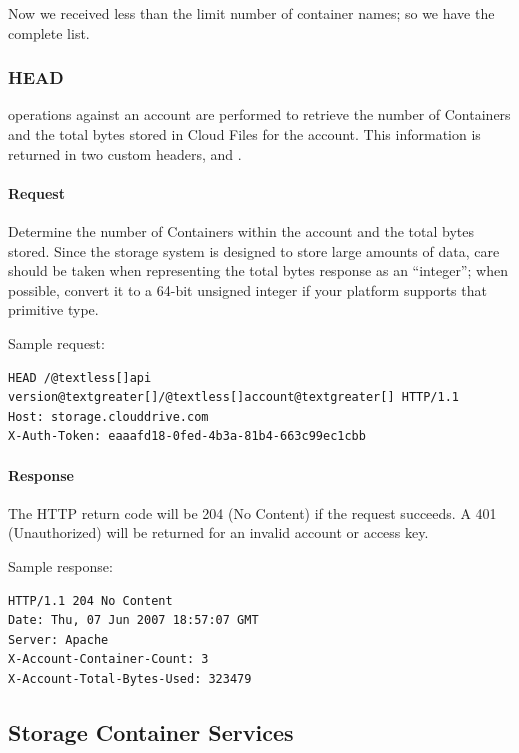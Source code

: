 \documentclass[letterpaper,10pt,english]{manual}
\begin{document}
Now we received less than the limit number of container names; so we have
the complete list.


\subsubsection{HEAD}

 operations against an account are performed to retrieve the
number of Containers and the total bytes stored in Cloud Files for the
account. This information is returned in two custom headers,
 and .


\paragraph{Request}

Determine the number of Containers within the account and the total bytes
stored.  Since the storage system is designed to store large amounts of
data, care should be taken when representing the total bytes response as
an “integer”; when possible, convert it to a 64-bit unsigned integer if
your platform supports that primitive type.

Sample request:

\begin{Verbatim}[commandchars=@\[\]]
HEAD /@textless[]api version@textgreater[]/@textless[]account@textgreater[] HTTP/1.1
Host: storage.clouddrive.com
X-Auth-Token: eaaafd18-0fed-4b3a-81b4-663c99ec1cbb
\end{Verbatim}


\paragraph{Response}

The HTTP return code will be 204 (No Content) if the request succeeds.
A 401 (Unauthorized) will be returned for an invalid account or access
key.

Sample response:

\begin{Verbatim}[commandchars=@\[\]]
HTTP/1.1 204 No Content
Date: Thu, 07 Jun 2007 18:57:07 GMT
Server: Apache
X-Account-Container-Count: 3
X-Account-Total-Bytes-Used: 323479
\end{Verbatim}


\subsection{Storage Container Services}
\end{document}
